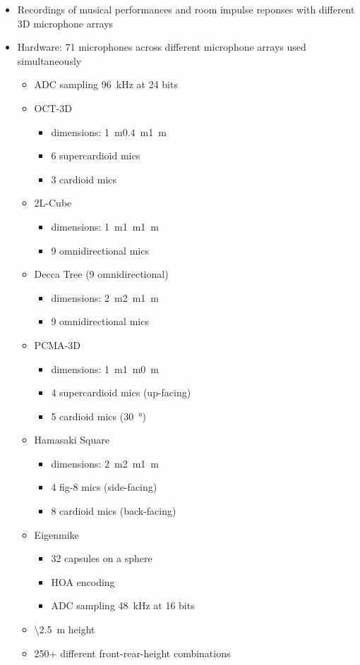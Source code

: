 \documentclass[14pt, oneside]{extarticle}
\begin{document}
\begin{itemize}

\item Recordings of musical performances and room impulse reponses with different 3D microphone arrays \cite{lee3d}

\item Hardware: 71 microphones across different microphone arrays used simultaneously
	\begin{itemize}
	\item ADC sampling \SI{96}{\kilo\hertz} at 24 bits
	\item OCT-3D \cite{theile20123d}
		\begin{itemize}
		\item dimensions: \SI{1}{\metre}\texttimes\SI{0.4}{\metre}\texttimes\SI{1}{\metre}
		\item 6 supercardioid mics
		\item 3 cardioid mics
		\end{itemize}
	\item 2L-Cube 
		\begin{itemize}
		\item dimensions: \SI{1}{\metre}\texttimes\SI{1}{\metre}\texttimes\SI{1}{\metre}
		\item 9 omnidirectional mics
		\end{itemize}
	\item Decca Tree (9 omnidirectional)
		\begin{itemize}
		\item dimensions: \SI{2}{\metre}\texttimes\SI{2}{\metre}\texttimes\SI{1}{\metre}
		\item 9 omnidirectional mics
		\end{itemize}
	\item PCMA-3D \cite{lee2014effect}
		\begin{itemize}
		\item dimensions: \SI{1}{\metre}\texttimes\SI{1}{\metre}\texttimes\SI{0}{\metre}
		\item 4 supercardioid mics (up-facing)
		\item 5 cardioid mics (\SI{30}{\degree})
		\end{itemize}
	\item Hamasaki Square
		\begin{itemize}
		\item dimensions: \SI{2}{\metre}\texttimes\SI{2}{\metre}\texttimes\SI{1}{\metre}
		\item 4 fig-8 mics (side-facing)
		\item 8 cardioid mics (back-facing)
		\end{itemize}
	\item Eigenmike
		\begin{itemize}
		\item 32 capsules on a sphere
		\item HOA encoding
		\item ADC sampling \SI{48}{\kilo\hertz} at 16 bits
		\end{itemize}
	\item \textbackslash \SI{2.5}{\metre} height
	\item 250+ different front-rear-height combinations
	\end{itemize}


\end{itemize}
\end{document}
